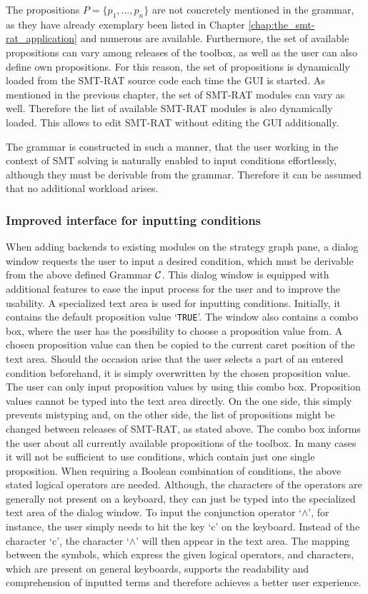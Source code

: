 The propositions $P = \{p_1, \dots, p_n\}$ are not concretely mentioned in the grammar, as they have already exemplary been listed in Chapter \ref{chap:the_smt-rat_application} and numerous are available. Furthermore, the set of available propositions can vary among releases of the toolbox, as well as the user can also define own propositions. For this reason, the set of propositions is dynamically loaded from the SMT-RAT source code each time the GUI is started. As mentioned in the previous chapter, the set of SMT-RAT modules can vary as well. Therefore the list of available SMT-RAT modules is also dynamically loaded. This allows to edit SMT-RAT without editing the GUI additionally.

The grammar is constructed in such a manner, that the user working in the context of SMT solving is naturally enabled to input conditions effortlessly, although they must be derivable from the grammar. Therefore it can be assumed that no additional workload arises.

\subsubsection{Improved interface for inputting conditions}
\label{sec:improved_interface_for_inputting_conditions}
When adding backends to existing modules on the strategy graph pane, a dialog window requests the user to input a desired condition, which must be derivable from the above defined Grammar $\cal C$. This dialog window is equipped with additional features to ease the input process for the user and to improve the usability. A specialized text area is used for inputting conditions. Initially, it contains the default proposition value `\texttt{TRUE}'. The window also contains a combo box, where the user has the possibility to choose a proposition value from. A chosen proposition value can then be copied to the current caret position of the text area. Should the occasion arise that the user selects a part of an entered condition beforehand, it is simply overwritten by the chosen proposition value. The user can only input proposition values by using this combo box. Proposition values cannot be typed into the text area directly. On the one side, this simply prevents mistyping and, on the other side, the list of 
propositions might be changed between releases of SMT-RAT, as stated above. The combo box informs the user about all currently available propositions of the toolbox. In many cases it will not be sufficient to use conditions, which contain just one single proposition. When requiring a Boolean combination of conditions, the above stated logical operators are needed. Although, the characters of the operators are generally not present on a keyboard, they can just be typed into the specialized text area of the dialog window. To input the conjunction operator `$\land$', for instance, the user simply needs to hit the key `c' on the keyboard. Instead of the character `c', the character `$\land$' will then appear in the text area. The mapping between the symbols, which express the given logical operators, and characters, which are present on general keyboards, supports the readability and comprehension of inputted terms and therefore achieves a better user experience.

